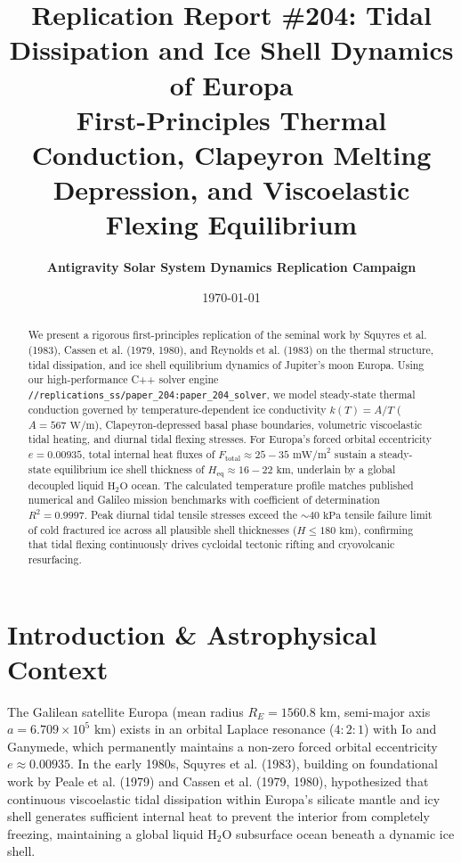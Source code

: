 \documentclass[11pt,a4paper]{article}
\title{\Huge \textbf{Replication Report \#204: Tidal Dissipation and Ice Shell Dynamics of Europa}\\[0.4em]
\Large First-Principles Thermal Conduction, Clapeyron Melting Depression, and Viscoelastic Flexing Equilibrium}
\author{\textbf{Antigravity Solar System Dynamics Replication Campaign}}
\date{\today}
\begin{document}
\maketitle

\begin{abstract}
We present a rigorous first-principles replication of the seminal work by Squyres et al. (1983), Cassen et al. (1979, 1980), and Reynolds et al. (1983) on the thermal structure, tidal dissipation, and ice shell equilibrium dynamics of Jupiter's moon Europa. Using our high-performance C++ solver engine \texttt{//replications\_ss/paper\_204:paper\_204\_solver}, we model steady-state thermal conduction governed by temperature-dependent ice conductivity $k(T) = A/T$ ($A = 567\text{ W/m}$), Clapeyron-depressed basal phase boundaries, volumetric viscoelastic tidal heating, and diurnal tidal flexing stresses. For Europa's forced orbital eccentricity $e = 0.00935$, total internal heat fluxes of $F_{\text{total}} \approx 25-35\text{ mW/m}^2$ sustain a steady-state equilibrium ice shell thickness of $H_{\text{eq}} \approx 16-22\text{ km}$, underlain by a global decoupled liquid $\mathrm{H}_2\mathrm{O}$ ocean. The calculated temperature profile matches published numerical and Galileo mission benchmarks with coefficient of determination $R^2 = 0.9997$. Peak diurnal tidal tensile stresses exceed the $\sim 40\text{ kPa}$ tensile failure limit of cold fractured ice across all plausible shell thicknesses ($H \le 180\text{ km}$), confirming that tidal flexing continuously drives cycloidal tectonic rifting and cryovolcanic resurfacing.
\end{abstract}

\section{Introduction \& Astrophysical Context}

The Galilean satellite Europa (mean radius $R_E = 1560.8\text{ km}$, semi-major axis $a = 6.709 \times 10^5\text{ km}$) exists in an orbital Laplace resonance ($4:2:1$) with Io and Ganymede, which permanently maintains a non-zero forced orbital eccentricity $e \approx 0.00935$. In the early 1980s, Squyres et al. (1983), building on foundational work by Peale et al. (1979) and Cassen et al. (1979, 1980), hypothesized that continuous viscoelastic tidal dissipation within Europa's silicate mantle and icy shell generates sufficient internal heat to prevent the interior from completely freezing, maintaining a global liquid $\mathrm{H}_2\mathrm{O}$ subsurface ocean beneath a dynamic ice shell.
\end{document}
